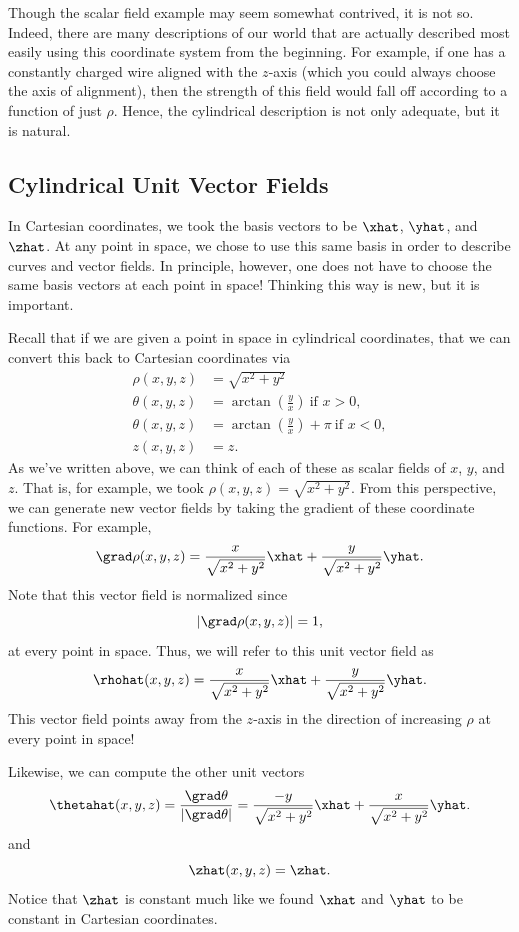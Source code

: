 Though the scalar field example may seem somewhat contrived, it is not so.  Indeed, there are many descriptions of our world that are actually described most easily using this coordinate system from the beginning.  For example, if one has a constantly charged wire aligned with the $z$-axis (which you could always choose the axis of alignment), then the strength of this field would fall off according to a function of just $\rho$.  Hence, the cylindrical description is not only adequate, but it is natural.

\subsection{Cylindrical Unit Vector Fields}

In Cartesian coordinates, we took the basis vectors to be $\xhat$, $\yhat$, and $\zhat$. At any point in space, we chose to use this same basis in order to describe curves and vector fields. In principle, however, one does not have to choose the same basis vectors at each point in space!  Thinking this way is new, but it is important.  

Recall that if we are given a point in space in cylindrical coordinates, that we can convert this back to Cartesian coordinates via
\begin{align*}
\rho(x,y,z) &= \sqrt{x^2+y^2}\\
\theta(x,y,z) &= \arctan\left(\frac{y}{x}\right) ~\textrm{if $x>0$}, \\
\theta(x,y,z) &= \arctan\left(\frac{y}{x}\right) + \pi ~\textrm{if $x<0$},\\
z(x,y,z) &= z.
\end{align*}
As we've written above, we can think of each of these as scalar fields of $x$, $y$, and $z$.  That is, for example, we took $\rho(x,y,z)=\sqrt{x^2+y^2}$.  From this perspective, we can generate new vector fields by taking the gradient of these coordinate functions.  For example,
\[
\grad \rho(x,y,z) = \frac{x}{\sqrt{x^2+y^2}}\xhat + \frac{y}{\sqrt{x^2+y^2}}\yhat.  
\]
Note that this vector field is normalized since
\[
\left|\grad \rho(x,y,z)\right| = 1,
\]
at every point in space.  Thus, we will refer to this unit vector field as
\[
\rhohat(x,y,z) = \frac{x}{\sqrt{x^2+y^2}}\xhat + \frac{y}{\sqrt{x^2+y^2}}\yhat.
\]
This vector field points away from the $z$-axis in the direction of increasing $\rho$ at every point in space!

Likewise, we can compute the other unit vectors
\[
\thetahat(x,y,z) = \frac{\grad \theta}{\left| \grad \theta \right|} = \frac{-y}{\sqrt{x^2+y^2}}\xhat + \frac{x}{\sqrt{x^2+y^2}}\yhat.
\]
and
\[
\zhat(x,y,z) = \zhat.
\]
Notice that $\zhat$ is constant much like we found $\xhat$ and $\yhat$ to be constant in Cartesian coordinates.

